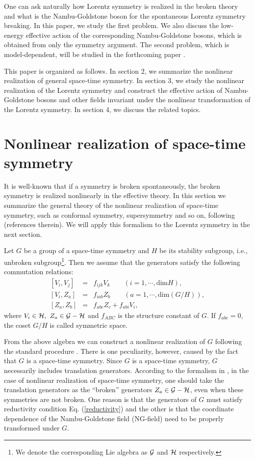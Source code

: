 \documentclass[a4paper,12pt]{article}
\begin{document}
One can ask naturally how Lorentz symmetry is realized in 
the broken theory and 
what is the Nambu-Goldstone boson for the spontaneous Lorentz
symmetry breaking. In this paper, we study the first problem.
We also discuss the low-energy effective action of the corresponding 
Nambu-Goldstone bosons, which is obtained from only the symmetry
argument.
The second problem, which is model-dependent, 
will be studied in the forthcoming paper \cite{H-Y}.

This paper is organized as follows. In section 2, we summarize
the nonlinear realization of general space-time symmetry.
In section 3, we study the nonlinear realization of the Lorentz symmetry
and construct the effective action of Nambu-Goldstone bosons 
and other fields invariant under the nonlinear transformation of 
the Lorentz symmetry.
In section 4, we discuss the related topics.  
 
\section{Nonlinear realization of space-time symmetry}
It is well-known that if a symmetry is broken spontaneously, the
broken symmetry is realized nonlinearly in the effective theory.
In this section we summarize the general theory of 
the nonlinear realization of space-time symmetry,
such as conformal symmetry, supersymmetry and so on, following
\cite{Ogievetsky} (references therein). 
We will apply this formalism to the Lorentz symmetry in the next section.

Let $G$ be a group of a space-time symmetry 
and $H$ be its stability subgroup, i.e., unbroken subgroup\footnote{
We denote the corresponding Lie algebra as ${\cal G}$ and ${\cal H}$ 
respectively.}. 
Then we assume that the generators satisfy the following commutation
relations:
\begin{eqnarray}
\left[ V_{i}, V_{j} \right] &=& f_{ijk} V_{k}
\qquad (i=1,\cdots,\textrm{dim}H), \\
\left[ V_{i}, Z_{a} \right] &=& f_{iab} Z_{b}
\qquad (a=1,\cdots,\textrm{dim}(G/H)), \label{reductivity}\\
\left[ Z_{a}, Z_{b} \right] &=& f_{abc} Z_{c} + f_{abi} V_{i},
\end{eqnarray}
where $V_{i} \in {\cal H},~Z_{a} \in {\cal G-H}$ and $f_{ABC}$ is the
structure constant of $G$. 
If $f_{abc} = 0$, the coset $G/H$ is called symmetric space.

From the above algebra 
we can construct a nonlinear realization of $G$ following the standard
procedure \cite{Weinberg}.
There is one peculiarity, however, caused by the fact 
that $G$ is a space-time symmetry.
Since $G$ is a space-time symmetry, $G$
necessarily includes translation generators.
According to the formalism in \cite{Ogievetsky}, 
in the case of nonlinear realization
of space-time symmetry, one should take the translation generators
as the ``broken'' generators $Z_{a} \in {\cal G-H}$,
even when these symmetries are not broken.
One reason is that the generators of $G$ must satisfy reductivity
condition Eq. (\ref{reductivity}) and the other is that the
coordinate dependence of the Nambu-Goldstone field (NG-field)
need to be properly transformed under $G$.
\end{document}
